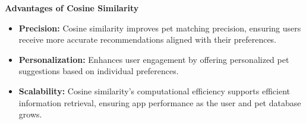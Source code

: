 \noindent\textbf{Advantages of Cosine Similarity}
\begin{itemize}
    \item \textbf{Precision:} Cosine similarity improves pet matching precision, ensuring users receive more accurate recommendations aligned with their preferences.

\item \textbf{Personalization:} Enhances user engagement by offering personalized pet suggestions based on individual preferences.

\item \textbf{Scalability:} Cosine similarity's computational efficiency supports efficient information retrieval, ensuring app performance as the user and pet database grows.
\end{itemize}
